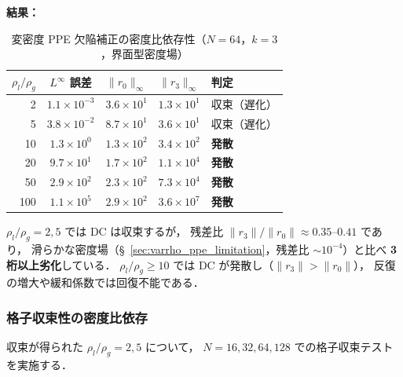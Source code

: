 \noindent\textbf{結果：}

\begin{table}[htbp]
\centering
\caption{変密度 PPE 欠陥補正の密度比依存性（$N = 64$，$k = 3$，界面型密度場）}
\label{tab:varrho_breakdown}
\renewcommand{\arraystretch}{1.3}
\begin{tabular}{rcccl}
\toprule
$\rho_l/\rho_g$ & $L^\infty$ 誤差 & $\|r_0\|_\infty$ & $\|r_3\|_\infty$ & 判定 \\
\midrule
   2 & $1.1 \times 10^{-3}$ & $3.6 \times 10^{1}$ & $1.3 \times 10^{1}$ & 収束（遅化） \\
   5 & $3.8 \times 10^{-2}$ & $8.7 \times 10^{1}$ & $3.6 \times 10^{1}$ & 収束（遅化） \\
  10 & $1.3 \times 10^{0}$  & $1.3 \times 10^{2}$ & $3.4 \times 10^{2}$ & \textbf{発散} \\
  20 & $9.7 \times 10^{1}$  & $1.7 \times 10^{2}$ & $1.1 \times 10^{4}$ & \textbf{発散} \\
  50 & $2.9 \times 10^{2}$  & $2.3 \times 10^{2}$ & $7.3 \times 10^{4}$ & \textbf{発散} \\
 100 & $1.1 \times 10^{5}$  & $2.9 \times 10^{2}$ & $3.6 \times 10^{7}$ & \textbf{発散} \\
\bottomrule
\end{tabular}
\end{table}

$\rho_l/\rho_g = 2, 5$ では DC は収束するが，
残差比 $\|r_3\| / \|r_0\| \approx 0.35$--$0.41$ であり，
滑らかな密度場（§~\ref{sec:varrho_ppe_limitation}，残差比 $\sim 10^{-4}$）と比べ
\textbf{3 桁以上劣化}している．
$\rho_l/\rho_g \geq 10$ では DC が発散し（$\|r_3\| > \|r_0\|$），
反復の増大や緩和係数では回復不能である．

\subsubsection{格子収束性の密度比依存}
\label{sec:varrho_grid_convergence}

\noindent
収束が得られた $\rho_l/\rho_g = 2, 5$ について，
$N = 16, 32, 64, 128$ での格子収束テストを実施する．

